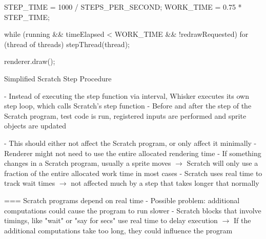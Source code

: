 \begin{listing}[ht]
    \centering
    \begin{javascriptcode}
        STEP_TIME = 1000 / STEPS_PER_SECOND;
        WORK_TIME = 0.75 * STEP_TIME;

        while (running &&
               timeElapsed < WORK_TIME &&
               !redrawRequested) {
            for (thread of threads) {
                stepThread(thread);
            }
        }

        renderer.draw();
    \end{javascriptcode}
    \vspace{-\bigskipamount}
    \caption{Simplified Scratch Step Procedure}
    \label{fig:simplified_scratch_step_procedure}
\end{listing}

- Instead of executing the step function via interval, Whisker executes its own step loop, which calls Scratch's step function
- Before and after the step of the Scratch program, test code is run, registered inputs are performed and sprite objects are updated

- This should either not affect the Scratch program, or only affect it minimally
    - Renderer might not need to use the entire allocated rendering time
    - If something changes in a Scratch program, usually a sprite moves $\rightarrow$ Scratch will only use a fraction of the entire allocated work time in most cases
    - Scratch uses real time to track wait times $\rightarrow$ not affected much by a step that takes longer that normally

=== Scratch programs depend on real time
- Possible problem: additional computations could cause the program to run slower
- Scratch blocks that involve timings, like "wait" or "say for secs" use real time to delay execution
$\rightarrow$ If the additional computations take too long, they could influence the program


